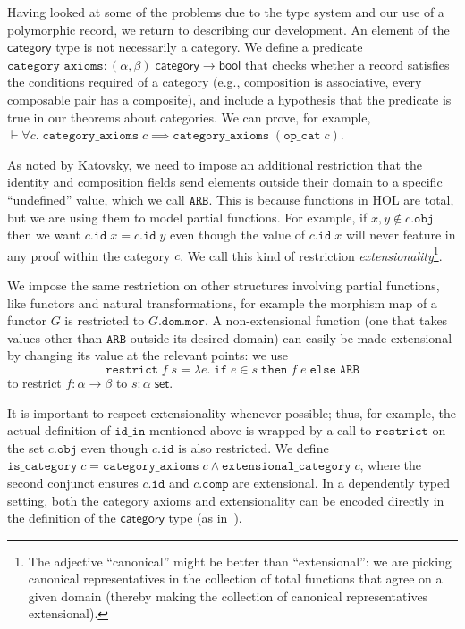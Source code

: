 \documentclass[twoside,titlepage,11pt]{article}
\begin{document}
Having looked at some of the problems due to the type system and our use of a polymorphic record, we return to describing our development.
An element of the $\mathsf{category}$ type is not necessarily a category.
We define a predicate $\mathtt{category\_axioms}:(\alpha,\beta)\;\mathsf{category}\to\mathsf{bool}$ that checks whether a record satisfies the conditions required of a category (e.g., composition is associative, every composable pair has a composite), and include a hypothesis that the predicate is true in our theorems about categories.
We can prove, for example, $\vdash\forall{c}.\;\mathtt{category\_axioms}\;c\implies\mathtt{category\_axioms}\;(\mathtt{op\_cat}\;c)$.

As noted by Katovsky, we need to impose an additional restriction that the identity and composition fields send elements outside their domain to a specific ``undefined'' value, which we call $\mathtt{ARB}$.
This is because functions in HOL are total, but we are using them to model partial functions.
For example, if $x,y\notin c.\mathtt{obj}$ then we want $c.\mathtt{id}\;x=c.\mathtt{id}\;y$ even though the value of $c.\mathtt{id}\;x$ will never feature in any proof within the category $c$.
We call this kind of restriction \emph{extensionality}\footnote{The adjective ``canonical'' might be better than ``extensional'': we are picking canonical representatives in the collection of total functions that agree on a given domain (thereby making the collection of canonical representatives extensional).}.

We impose the same restriction on other structures involving partial functions, like functors and natural transformations, for example the morphism map of a functor $G$ is restricted to $G.\mathtt{dom}.\mathtt{mor}$.
A non-extensional function (one that takes values other than $\mathtt{ARB}$ outside its desired domain) can easily be made extensional by changing its value at the relevant points: we use $$\mathtt{restrict}\;f\;s=\lambda{e}.\;\mathtt{if}\;e\in s\;\mathtt{then}\;f\;e\;\mathtt{else}\;\mathtt{ARB}$$ to restrict $f:\alpha\to\beta$ to $s:\alpha\;\mathsf{set}$.

It is important to respect extensionality whenever possible; thus, for example, the actual definition of $\mathtt{id\_in}$ mentioned above is wrapped by a call to $\mathtt{restrict}$ on the set $c.\mathtt{obj}$ even though $c.\mathtt{id}$ is also restricted.
We define $\mathtt{is\_category}\;c=\mathtt{category\_axioms}\;c\land\mathtt{extensional\_category}\;c$, where the second conjunct ensures $c.\mathtt{id}$ and $c.\mathtt{comp}$ are extensional.
In a dependently typed setting, both the category axioms and extensionality can be encoded directly in the definition of the $\mathsf{category}$ type (as in~\cite{DBLP:conf/birthday/HuetS00,Sozeau,Megacz}).
\end{document}
